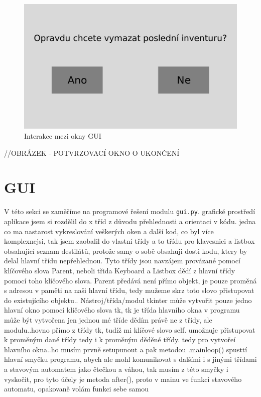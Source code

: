 \begin{figure}[H]
    \begin{center}
        \includegraphics[scale=0.4]{obrazky/GUI Vymazání inventury.png}
    \end{center}
    \caption{Interakce mezi okny GUI}
    \label{Interakce mezi okny GUI}
\end{figure}
//OBRÁZEK - POTVRZOVACÍ OKNO O UKONČENÍ

\section{GUI}
V této sekci se zaměříme na programové řešení modulu \texttt{gui.py}. grafické prostředí aplikace jsem si rozdělil do x tříd z důvodu přehlednosti a orientaci v kódu. jedna co ma nastarost vykreslování veškerých oken a další kod, co byl více komplexnejsi, tak jsem zaobalil do vlastní třídy a to třídu pro klavesnici a listbox obsahující seznam destilátů, protože samy o sobě obsahuji dosti kodu, ktery by delal hlavní třídu nepřehlednou. Tyto třídy jsou navzájem provázané pomocí klíčového slova Parent, neboli třida Keyboard a Listbox dědí z hlavní třídy pomocí toho klíčového slova. Parent předává není přímo objekt, je pouze proměná s adresou v paměti na naši hlavní třídu, tedy mužeme skrz toto slovo přistupovat do existujícího objektu.. Nástroj/třída/modul tkinter může vytvořit pouze jedno hlavní okno pomocí klíčového slova tk, tk je třída hlavního okna v programu může být vytvořena jen jednou mé tříde dědím právě ne z třídy, ale modulu..hovno přímo z třídy tk, tudíž mi klíčové slovo self. umožnuje přistupovat k proměným dané třídy tedy i k proměným děděné třídy. tedy pro vytvořeí hlavního okna..ho musím prvně setupunout a pak metodou .mainloop() spusttí hlavní smyčku programu, abych ale mohl komunikovat s dalšími i s jinými třídami a stavovým automatem jako čtečkou a váhou, tak musím z této smyčky i vyskočit, pro tyto účely je metoda after(), proto v mainu ve funkci stavového automatu, opakovaně volám funkci sebe samou

